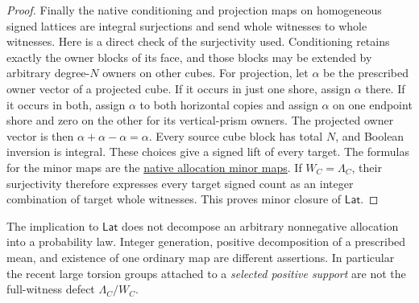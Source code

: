 \begin{proof}
Finally the native conditioning and projection maps on homogeneous
signed lattices are integral surjections and send whole witnesses to
whole witnesses. Here is a direct check of the surjectivity used.
Conditioning retains exactly the owner blocks of its face, and those
blocks may be extended by arbitrary degree-$N$ owners on other cubes.
For projection, let $\alpha$ be the prescribed owner vector of a
projected cube. If it occurs in just one shore, assign $\alpha$ there.
If it occurs in both, assign $\alpha$ to both horizontal copies and
assign $\alpha$ on one endpoint shore and zero on the other for its
vertical-prism owners. The projected owner vector is then
$\alpha+\alpha-\alpha=\alpha$.
Every source cube block has total $N$, and Boolean inversion is
integral. These choices give a signed lift of every target.
The formulas for the minor maps are the
\href{../containment-campaigns/ALLOCATION_FUNCTORS.md}{native allocation minor maps}.
If $W_C=\Lambda_C$, their surjectivity therefore expresses every target
signed count as an integer combination of target whole witnesses.
This proves minor closure of $\mathsf{Lat}$.
\end{proof}

The implication to $\mathsf{Lat}$ does not decompose an arbitrary
nonnegative allocation into a probability law. Integer generation,
positive decomposition of a prescribed mean, and existence of one
ordinary map are different assertions. In particular the recent large
torsion groups attached to a \emph{selected positive support} are not
the full-witness defect $\Lambda_C/W_C$.

